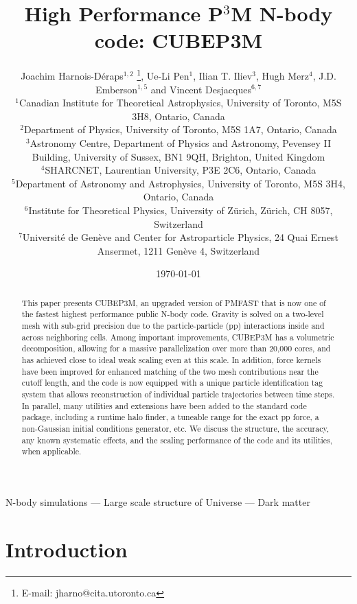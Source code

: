 \documentclass[useAMS,usenatbib]{mn2e}
\title[{\small}  High Performance P$^{3}$M N-body code: CUBEP3M]{{\small} High Performance P$^{3}$M N-body code: CUBEP3M}
\author[Joachim Harnois-D\'{e}raps, Ue-Li Pen, Ilian T. Iliev, Hugh Merz, JD Emberson, Vincent Desjacques]{Joachim Harnois-D\'{e}raps$^{1,2}$ 
\thanks{E-mail: jharno@cita.utoronto.ca},  Ue-Li Pen$^{1}$, 
Ilian T. Iliev$^{3}$, Hugh Merz$^{4}$, \newauthor
J.D. Emberson$^{1,5}$ and Vincent Desjacques$^{6,7}$\\
$^{1}$Canadian Institute for Theoretical Astrophysics, University of
Toronto, M5S 3H8, Ontario, Canada\\
$^{2}$Department of Physics, University of Toronto, M5S 1A7, Ontario,  Canada\\
$^{3}$Astronomy Centre, Department of Physics and Astronomy, Pevensey II Building, University of Sussex, BN1 9QH, Brighton, United Kingdom\\
$^{4}$SHARCNET, Laurentian University, P3E 2C6, Ontario, Canada\\
$^{5}$Department of Astronomy and Astrophysics, University of Toronto, M5S 3H4, Ontario, Canada\\
$^{6}$Institute for Theoretical Physics, University of Z\"{u}rich, Z\"{u}rich, CH 8057, Switzerland\\
$^{7}$Universit\'{e} de Gen\`{e}ve and Center for Astroparticle Physics, 24 Quai Ernest Ansermet, 1211 Gen\`{e}ve 4, Switzerland}
\begin{document}
\date{\today}

\pagerange{\pageref{firstpage}--\pageref{lastpage}} 

\maketitle

\label{firstpage}

\begin{abstract}
This paper presents {\small CUBEP3M}, an upgraded version of {\small PMFAST} that
is now one of the fastest highest performance public N-body code. 
Gravity is solved  on a two-level mesh with sub-grid precision due to the particle-particle (pp)
interactions inside and across neighboring cells.
Among important improvements,  {\small CUBEP3M} has a volumetric decomposition,
allowing for a massive parallelization over more than 20,000 cores, and has achieved close to ideal weak scaling
even at this scale.  In addition, force kernels have been improved for enhanced matching of the two mesh contributions near the cutoff length, and the code is now equipped with a unique particle identification tag system that allows reconstruction of individual particle trajectories between time steps.
In parallel, many utilities and extensions have been added to the standard code package, 
including a runtime halo finder, a tuneable range for the exact pp force, a non-Gaussian initial conditions generator, etc.
We discuss the structure, the accuracy, any known systematic effects, and the scaling performance
of the code and its utilities, when applicable.
\end{abstract}

\begin{keywords}
N-body simulations --- Large scale structure of Universe --- Dark matter
\end{keywords}


\section{Introduction}
\end{document}
